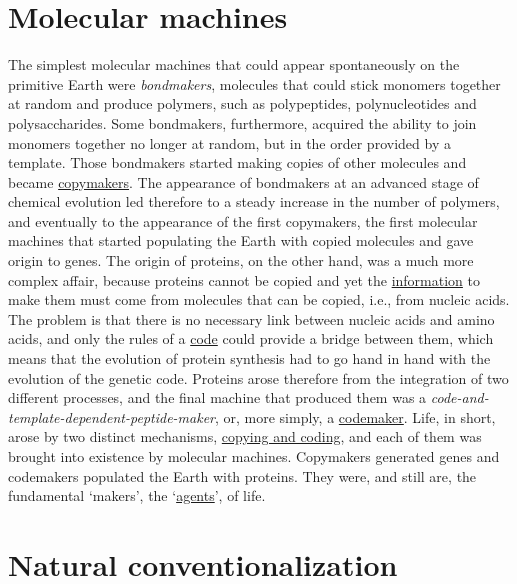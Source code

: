 \documentclass[12pt]{article}
\begin{document}
\hypertarget{molecular_machines}{}
\section{Molecular machines}
The simplest molecular machines that could appear spontaneously on the primitive Earth were \textit{bondmakers}, molecules that could stick monomers together at random and produce polymers, such as polypeptides, polynucleotides and polysaccharides. Some bondmakers, furthermore, acquired the ability to join monomers together no longer at random, but in the order provided by a template. Those bondmakers started making copies of other molecules and became \hyperlink{copymakers}{copymakers}. The appearance of bondmakers at an advanced stage of chemical evolution led therefore to a steady increase in the number of polymers, and eventually to the appearance of the first copymakers, the first molecular machines that started populating the Earth with copied molecules and gave origin to genes. The origin of proteins, on the other hand, was a much more complex affair, because proteins cannot be copied and yet the \hyperlink{organic_information}{information} to make them must come from molecules that can be copied, i.e., from nucleic acids. The problem is that there is no necessary link between nucleic acids and amino acids, and only the rules of a \hyperlink{code}{code} could provide a bridge between them, which means that the evolution of protein synthesis had to go hand in hand with the evolution of the genetic code. Proteins arose therefore from the integration of two different processes, and the final machine that produced them was a \textit{code-and-template-dependent-peptide-maker}, or, more simply, a \hyperlink{codemakers}{codemaker}. Life, in short, arose by two distinct mechanisms, \hyperlink{copying_and_coding}{copying and coding}, and each of them was brought into existence by molecular machines. Copymakers generated genes and codemakers populated the Earth with proteins. They were, and still are, the fundamental `makers', the `\hyperlink{agent}{agents}', of life.


\hypertarget{natural_conventionalization}{}
\section{Natural conventionalization}
\end{document}
